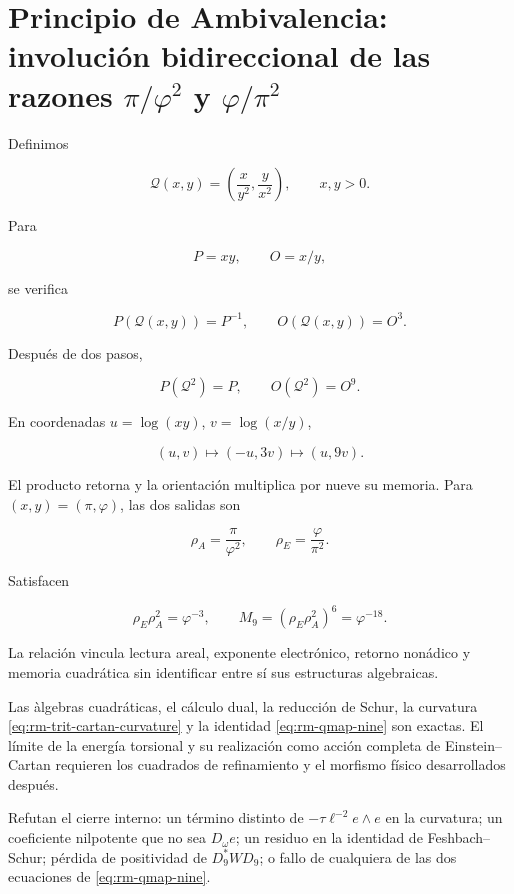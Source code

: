 \section{Principio de Ambivalencia: involución bidireccional de las razones \(\pi/\varphi^2\) y \(\varphi/\pi^2\)}

Definimos

\[
\mathcal Q(x,y)=\left(\frac{x}{y^2},\frac{y}{x^2}\right),
\qquad x,y>0.
\]

Para

\[
P=xy,
\qquad
O=x/y,
\]

se verifica

\[
P(\mathcal Q(x,y))=P^{-1},
\qquad
O(\mathcal Q(x,y))=O^3.
\]

Después de dos pasos,

\begin{equation}
\boxed{P(\mathcal Q^2)=P,
\qquad O(\mathcal Q^2)=O^9.}
\label{eq:rm-qmap-nine}
\end{equation}

En coordenadas \(u=\log(xy)\), \(v=\log(x/y)\),

\[
(u,v)\longmapsto(-u,3v)\longmapsto(u,9v).
\]

El producto retorna y la orientaci\'on multiplica por nueve su memoria. Para
\((x,y)=(\pi,\varphi)\), las dos salidas son

\[
\rho_A=\frac{\pi}{\varphi^2},
\qquad
\rho_E=\frac{\varphi}{\pi^2}.
\]

Satisfacen

\[
\rho_E\rho_A^2=\varphi^{-3},
\qquad
M_9=(\rho_E\rho_A^2)^6=\varphi^{-18}.
\]

La relaci\'on vincula lectura areal, exponente electr\'onico, retorno non\'adico
y memoria cuadr\'atica sin identificar entre s\'i sus estructuras algebraicas.

\begin{proofstatusbox}
Las \`algebras cuadr\'aticas, el c\'alculo dual, la reducci\'on de Schur, la
curvatura \eqref{eq:rm-trit-cartan-curvature} y la identidad
\eqref{eq:rm-qmap-nine} son exactas. El l\'imite de la energ\'ia torsional y su
realizaci\'on como acci\'on completa de Einstein--Cartan requieren los
cuadrados de refinamiento y el morfismo f\'isico desarrollados despu\'es.
\end{proofstatusbox}

\begin{falsifierbox}
Refutan el cierre interno: un t\'ermino distinto de
\(-\tau\ell^{-2}e\wedge e\) en la curvatura; un coeficiente nilpotente que no
sea \(D_\omega e\); un residuo en la identidad de Feshbach--Schur; p\'erdida
de positividad de \(D_9^*WD_9\); o fallo de cualquiera de las dos ecuaciones
de \eqref{eq:rm-qmap-nine}.
\end{falsifierbox}
